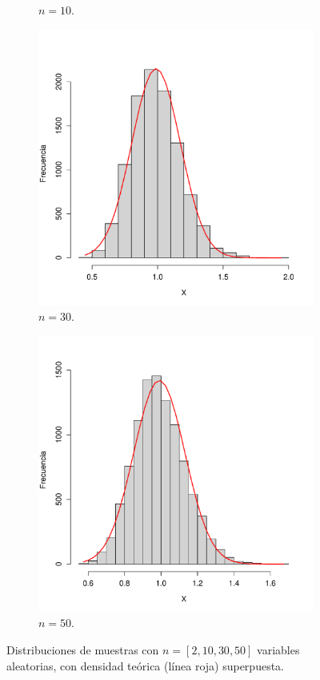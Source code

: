 \documentclass[paper=leter, fontsize=11pt]{scrartcl}
\begin{document}
\begin{figure}
\begin{subfigure}{.5\textwidth}
      \caption{$n = 10$.}
  \end{subfigure}
  \begin{subfigure}{.5\textwidth}
    \centering
    \includegraphics[scale=0.4]{ej_30.pdf}
    \caption{$n = 30$.}
\end{subfigure}
\begin{subfigure}{.5\textwidth}
  \centering
  \includegraphics[scale=0.4]{ej_50.pdf}
  \caption{$n = 50$.}
\end{subfigure}
  \caption{Distribuciones de muestras con $n = [2, 10, 30, 50]$ variables aleatorias, con densidad teórica (línea roja) superpuesta.}
  \label{fig:ejemplos}
\end{figure}
\end{document}
